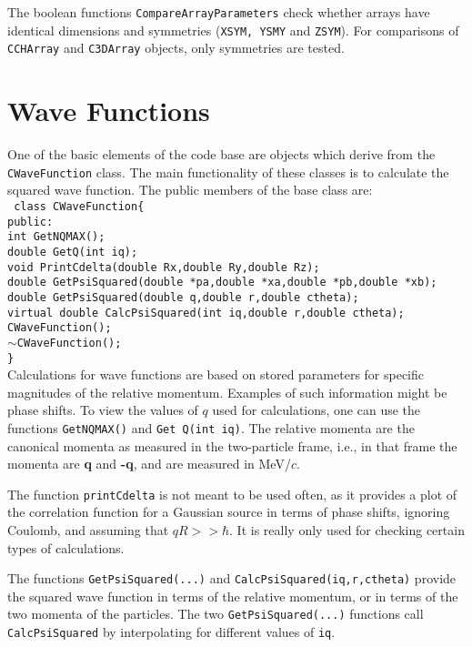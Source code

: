 \documentclass[10pt]{article}
\def\tab{\hspace*{9pt}}
\begin{document}
The boolean functions {\tt CompareArrayParameters} check whether arrays have identical dimensions and symmetries ({\tt XSYM, YSMY} and {\tt ZSYM}). For comparisons of {\tt CCHArray} and {\tt C3DArray} objects, only symmetries are tested.

\section{Wave Functions}

One of the basic elements of the code base are objects which derive from the {\tt CWaveFunction} class. The main functionality of these classes is to calculate the squared wave function. The public members of the base class are:\\

{\tt
class CWaveFunction\{\\
\tab public:\\
\tab \tab int GetNQMAX();\\
\tab \tab double GetQ(int iq);\\
\tab \tab void PrintCdelta(double Rx,double Ry,double Rz);\\
\tab \tab double GetPsiSquared(double *pa,double *xa,double *pb,double *xb);\\
\tab \tab double GetPsiSquared(double q,double r,double ctheta);\\
\tab \tab virtual double CalcPsiSquared(int iq,double r,double ctheta);\\
\tab \tab CWaveFunction();\\
\tab \tab $\sim$CWaveFunction();\\
\}\\ }
Calculations for wave functions are based on stored parameters for specific magnitudes of the relative momentum. Examples of such information might be phase shifts. To view the values of $q$ used for calculations, one can use the functions {\tt GetNQMAX()} and {\tt Get Q(int iq)}. The relative momenta are the canonical momenta as measured in the two-particle frame, i.e., in that frame the momenta are {\bf q} and {\bf -q}, and are measured in MeV/$c$.

The function {\tt printCdelta} is not meant to be used often, as it provides a plot of the correlation function for a Gaussian source in terms of phase shifts, ignoring Coulomb, and assuming that $qR>>\hbar$. It is really only used for checking certain types of calculations.

The functions {\tt GetPsiSquared(...)} and {\tt CalcPsiSquared(iq,r,ctheta)} provide the squared wave function in terms of the relative momentum, or in terms of the two momenta of the particles. The two {\tt GetPsiSquared(...)} functions call {\tt CalcPsiSquared} by interpolating for different values of {\tt iq}.
\end{document}
